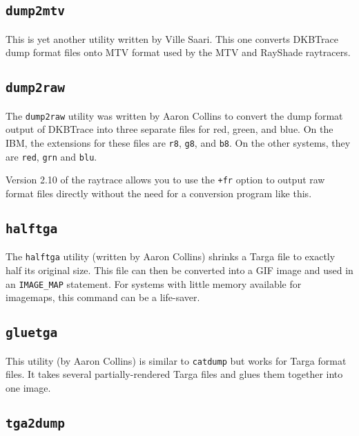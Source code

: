 \subsection{{\tt dump2mtv}}

This is yet another utility written by Ville Saari.  This one converts
DKBTrace dump format files onto MTV format used by the MTV and RayShade
raytracers.

\subsection{{\tt dump2raw}}

The {\tt dump2raw} utility was written by Aaron Collins to convert the
dump format output of DKBTrace into three separate files for red,
green, and blue.  On the IBM, the extensions for these files are
{\tt r8}, {\tt g8}, and {\tt b8}.  On the other systems, they are
{\tt red}, {\tt grn} and {\tt blu}.

Version 2.10 of the raytrace allows you to use the {\tt +fr}
option to output raw format files directly without the need for
a conversion program like this.

\subsection{{\tt halftga}}

The {\tt halftga} utility (written by Aaron Collins) shrinks a
Targa file to exactly half its original size.  This file can
then be converted into a GIF image and used in an
{\tt IMAGE_MAP}
statement.  For systems with little memory available for imagemaps,
this command can be a life-saver.

\subsection{{\tt gluetga}}

This utility (by Aaron Collins) is similar to {\tt catdump} but works
for Targa format files.  It takes several
partially-rendered Targa files and glues them together
into one image. 

\subsection{{\tt tga2dump}}

